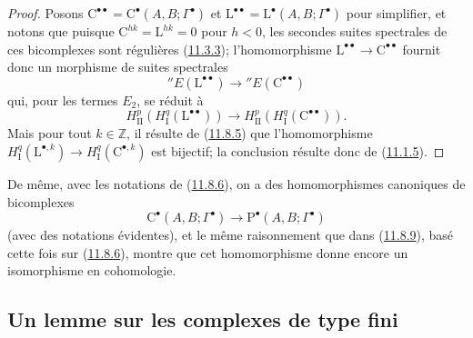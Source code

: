 \begin{proof}
Posons $\mathrm C^{\bullet\bullet}=
\mathrm C^\bullet(A,B;\Gamma^\bullet)$ et
$\mathrm L^{\bullet\bullet}=
\mathrm L^\bullet(A,B;\Gamma^\bullet)$ pour simplifier, et notons que
puisque $\mathrm C^{hk}=\mathrm L^{hk}=0$ pour $h<0$, les secondes suites
spectrales de ces bicomplexes sont régulières
(\hyperref[0.11.3.3-fr]{11.3.3}); l'homomorphisme
$\mathrm L^{\bullet\bullet}\to\mathrm C^{\bullet\bullet}$ fournit donc un
morphisme de suites spectrales
\[
{}''E(\mathrm L^{\bullet\bullet})\longrightarrow
{}''E(\mathrm C^{\bullet\bullet})
\]
qui, pour les termes $E_2$, se réduit à
\[
\label{0.11.8.9.1-fr}
\tag{11.8.9.1}
H^p_{\mathrm{II}}(H^q_{\mathrm I}(\mathrm L^{\bullet\bullet}))
\longrightarrow
H^p_{\mathrm{II}}(H^q_{\mathrm I}(\mathrm C^{\bullet\bullet})).
\]
Mais pour tout $k\in\mathbb Z$, il résulte de
(\hyperref[0.11.8.5-fr]{11.8.5}) que l'homomorphisme
$H^q_{\mathrm I}(\mathrm L^{\bullet,k})\to
H^q_{\mathrm I}(\mathrm C^{\bullet,k})$ est bijectif; la conclusion résulte
donc de (\hyperref[0.11.1.5-fr]{11.1.5}).
\end{proof}

\begin{env}[11.8.10]
\label{0.11.8.10-fr}
De même, avec les notations de (\hyperref[0.11.8.6-fr]{11.8.6}), on a des
homomorphismes canoniques de bicomplexes
\[
\mathrm C^\bullet(A,B;\Gamma^\bullet)\longrightarrow
\mathrm P^\bullet(A,B;\Gamma^\bullet)
\]
(avec des notations évidentes), et le même raisonnement que dans
(\hyperref[0.11.8.9-fr]{11.8.9}), basé cette fois sur
(\hyperref[0.11.8.6-fr]{11.8.6}), montre que cet homomorphisme donne encore
un isomorphisme en cohomologie.
\end{env}

\subsection{Un lemme sur les complexes de type fini}
\label{subsection:0.11.9-fr}

